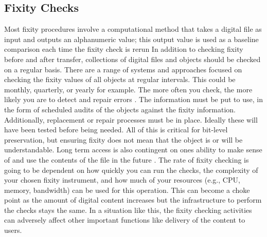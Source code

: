 \documentclass[final]{vutinfth}
\begin{document}
\subsection{Fixity Checks}
Most fixity procedures involve a computational method that takes a digital file as input and outputs an alphanumeric value; this output value is used as a baseline comparison each time the fixity check is rerun \cite[5]{ndsa2017fixity}
In addition to checking fixity before and after transfer, collections of digital files and objects should be checked on a regular basis. There are a range of systems and approaches focused on checking the fixity values of all objects at regular intervals. This could be monthly, quarterly, or yearly for example. The more often you check, the more likely you are to detect and repair errors \cite[4]{ndsa2014fixity}.
The information must be put to use, in the form of scheduled audits of the objects against the fixity information. Additionally, replacement or repair processes must be in place. Ideally these will have been tested before being needed. All of this is critical for bit-level preservation, but ensuring fixity does not mean that the object is or will be understandable. Long term access is also contingent on ones ability to make sense of and use the contents of the file in the future \cite[2]{ndsa2014fixity}.
The rate of fixity checking is going to be dependent on how quickly you can run the checks, the complexity of your chosen fixity instrument, and how much of your resources (e.g., CPU, memory, bandwidth) can be used for this operation. This can become a choke point as the amount of digital content increases but the infrastructure to perform the checks stays the same. In a situation like this, the fixity checking activities can adversely affect other important functions like delivery of the content to users.
\end{document}

